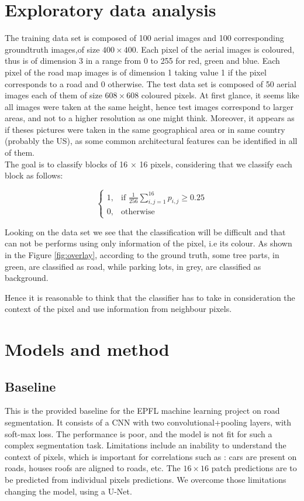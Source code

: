 \documentclass[10pt,conference,compsocconf]{IEEEtran}
\begin{document}
\section{Exploratory data analysis}
The training data set is composed of 100 aerial images and 100 corresponding groundtruth images,of size $400\times400$. Each pixel of the aerial images is coloured, thus is of dimension 3 in a range from 0 to 255 for red, green and blue. Each pixel of the road map images is of dimension 1 taking value 1 if the pixel corresponds to a road and 0 otherwise. The test data set is composed of 50 aerial images each of them of size $608\times608$ coloured pixels. At first glance, it seems like all images were taken at the same height, hence test images correspond to larger areas, and not to a higher resolution as one might think. Moreover, it appears as if theses pictures were taken in the same geographical area or in same country (probably the US), as some common architectural features can be identified in all of them. \\

The goal is to classify blocks of 16 $\times$ 16 pixels, considering that we classify each block as follows:

\[
\begin{cases}
    1, & \text{if } \frac{1}{256}\sum\limits^{16}_{i,j=1}p_{i,j} \geq 0.25\\
    0, & \text{otherwise}
\end{cases}
\]

Looking on the data set we see that the classification will be difficult and that can not be performs using only information of the pixel, i.e its colour. As shown in the Figure \ref{fig:overlay}, according to the ground truth, some tree parts, in green, are classified as road, while parking lots, in grey, are classified as background. 

Hence it is reasonable to think that the classifier has to take in consideration the context of the pixel and use information from neighbour pixels.

\section{Models and method}

\subsection{Baseline}

This is the provided baseline for the EPFL machine learning project on road segmentation. It consists of a CNN with two convolutional+pooling layers, with soft-max loss. The performance is poor, and the model is not fit for such a complex segmentation task. Limitations include an inability to understand the context of pixels, which is important for correlations such as : cars are present on roads, houses roofs are aligned to roads, etc. The $16\times16$ patch predictions are to be predicted from individual pixels predictions. We overcome those limitations changing the model, using a U-Net.
\end{document}
